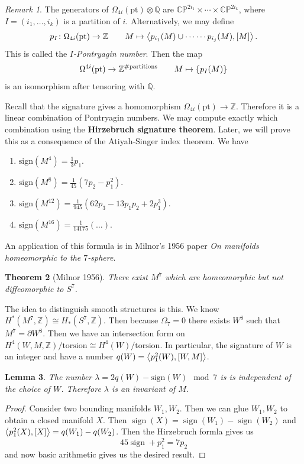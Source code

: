 \documentclass[leqno, openany]{memoir}
\newtheorem{thm}{Theorem}[section]
\newtheorem{lem}[thm]{Lemma}
\theoremstyle{definition}
\theoremstyle{remark}
\newtheorem{rmk}[thm]{Remark}
\theoremstyle{plain}
\theoremstyle{definition}
\theoremstyle{remark}
\newcommand{\C}{\mathbb{C}}
\newcommand{\Z}{\mathbb{Z}}
\newcommand{\Q}{\mathbb{Q}}
\renewcommand{\P}{\mathbb{P}}
\newcommand{\mr}[1]{\mathrm{#1}}
\DeclareMathOperator{\sign}{sign}
\begin{document}
\begin{rmk} The generators of $\Omega_{4i}(\mr{pt}) \otimes \Q$ are
    $\C\P^{2i_1} \times \cdots \times \C\P^{2i_k}$, where $I = (i_1, \ldots,
    i_k)$ is a partition of $i$. Alternatively, we may define \[ p_I \colon
    \Omega_{4i} (\mr{pt}) \to \Z \qquad M \mapsto \ev{p_{i_1}(M) \cup \cdots
\cdots p_{i_j}(M), [M]}. \] This is called the \textit{$I$-Pontryagin number}.
Then the map \[ \Omega^{4i}(\mr{pt}) \to \Z^{\# \text{partitions}} \qquad M
\mapsto \qty{p_I(M)} \] is an isomorphism after tensoring with $\Q$. 

    Recall that the signature gives a homomorphism $\Omega_{4i}(\mr{pt}) \to
    \Z$. Therefore it is a linear combination of Pontryagin numbers. We may
    compute exactly which combination using the \textbf{Hirzebruch signature
    theorem}. Later, we will prove this as a consequence of the Atiyah-Singer
    index theorem. We have \begin{enumerate} \item $\mr{sign}(M^4) =
        \frac{1}{3} p_1$.  \item $\mr{sign}(M^8) = \frac{1}{45} (7p_2 -
        p_1^2)$.  \item $\mr{sign}(M^{12}) = \frac{1}{945}(62p_3 - 13 p_1p_2 +
        2 p_1^3)$.  \item $\mr{sign}(M^{16}) = \frac{1}{14175}(\ldots)$.
    \end{enumerate} \end{rmk} An application of this formula is in Milnor's
    1956 paper \textit{On manifolds homeomorphic to the $7$-sphere}.
    \begin{thm}[Milnor 1956] There exist $M^7$ which are homeomorphic but not
        diffeomorphic to $S^7$.  \end{thm} The idea to distinguish smooth
        structures is this. We know $H^*(M^7, \Z) \cong H_*(S^7, \Z)$. Then
        because $\Omega_7 = 0$ there exists $W^8$ such that $M^7 = \partial
        W^8$. Then we have an intersection form on $H^4(W, M,
        \Z)/\text{torsion} \cong H^4(W)/\text{torsion}$. In particular, the
        signature of $W$ is an integer and have a number $q(W) = \ev{p_1^2(W),
        [W,M]}$.  \begin{lem} The number $\lambda = 2q(W) - \text{sign}(W) \mod
        7$ is is independent of the choice of $W$. Therefore $\lambda$ is an
    invariant of $M$.  \end{lem}

\begin{proof} Consider two bounding manifolds $W_1, W_2$. Then we can glue
    $W_1, W_2$ to obtain a closed manifold $X$. Then $\sign(X) = \sign(W_1) -
    \sign(W_2)$ and $\ev{p_1^2(X), [X]} = q(W_1) - q(W_2)$. Then the Hirzebruch
    formla gives us \[ 45 \sign + p_1^2 = 7 p_2 \] and now basic arithmetic
gives us the desired result.  \end{proof}
\end{document}

